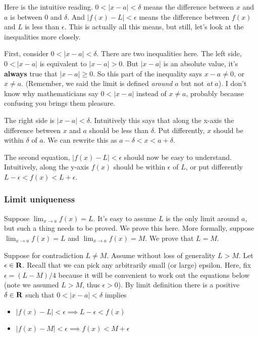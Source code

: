 \vs

Here is the intuitive reading. $0<|x-a|<\delta$ means the difference
between $x$ and $a$ is between $0$ and $\delta$. And
$|f(x)-L|<\epsilon$ means the difference between $f(x)$ and $L$ is less than
$\epsilon$. This is actually all this means, but still, let's look at the
inequalities more closely.

\vs

First, consider $0<|x-a|<\delta$. There are two inequalities here. The left
side, $0<|x-a|$ is equivalent to $|x-a|>0$. But $|x-a|$ is an absolute
value, it's \textbf{always} true that $|x-a|\geq 0$. So this part of the
inequality says $x-a\neq 0$, or $x\neq a$. (Remember, we said the limit is
defined \textit{around} $a$ but not \textit{at} $a$). I don't know why
mathematicians say $0<|x-a|$ instead of $x\neq a$, probably because
confusing you brings them pleasure.

\vs

The right side is $|x-a|<\delta$. Intuitively this says that along the
x-axis the difference between $x$ and $a$ should be less than
$\delta$. Put differently, $x$ should be within $\delta$ of $a$. We can rewrite
this as $a-\delta<x<a+\delta$.

\vs

The second equation, $|f(x)-L|<\epsilon$ should now be easy to understand.
Intuitively, along the y-axis $f(x)$ should be within $\epsilon$ of
$L$, or put differently $L-\epsilon<f(x)<L+\epsilon$.

\subsubsection*{Limit uniqueness}

Suppose $\lim_{x\to a}f(x)=L$. It's easy to assume $L$ is the only limit
around $a$, but such a thing needs to be proved. We prove this here.
More formally, suppose $\lim_{x\to a}f(x)=L$ and
$\lim_{x\to a}f(x)=M$. We prove that $L=M$.

\vs

Suppose for contradiction $L\neq M$. Assume without loss of generality
$L>M$. Let $\epsilon\in\mathbf{R}$. Recall that we can pick any arbitrarily small (or
large) epsilon. Here, fix $\epsilon=(L-M)/4$ because it will be convenient to
work out the equations below (note we assumed $L>M$, thus
$\epsilon>0$). By limit definition there is a positive $\delta\in\mathbf{R}$ such that
$0<|x-a|<\delta$ implies

\begin{itemize}
\item $|f(x)-L|<\epsilon\implies L-\epsilon<f(x)$
\item $|f(x)-M|<\epsilon\implies f(x)<M+\epsilon$
\end{itemize}
    
